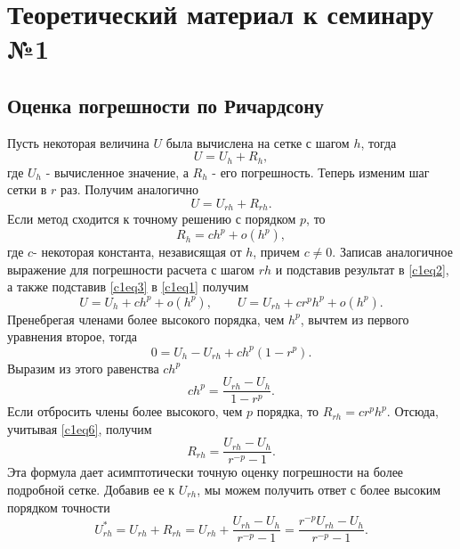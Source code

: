 \section{Теоретический материал к семинару №1}

\subsection{Оценка погрешности по Ричардсону}
Пусть некоторая величина $U$ была вычислена на сетке с шагом $h$, тогда
\begin{equation} \label{c1eq1}
U = U_h + R_h,
\end{equation}
где $U_h$ - вычисленное значение, а $R_h$ - его погрешность. Теперь изменим шаг сетки в $r$ раз. Получим аналогично
\begin{equation} \label{c1eq2}
U = U_{rh} + R_{rh}.
\end{equation}
Если метод сходится к точному решению с порядком $p$, то
\begin{equation} \label{c1eq3}
R_h = ch^p + o(h^p),
\end{equation}
где $c$- некоторая константа, независящая от $h$, причем $c \neq 0$.
Записав аналогичное выражение для погрешности расчета с шагом $rh$ и подставив результат в \eqref{c1eq2}, а также подставив \eqref{c1eq3} в \eqref{c1eq1} получим
\begin{equation} \label{c1eq4}
U = U_h + ch^p + o(h^p),
\qquad 
U = U_{rh} + cr^ph^p + o(h^p).
\end{equation}
Пренебрегая членами более высокого порядка, чем $h^p$, вычтем из первого уравнения второе, тогда
\begin{equation} \label{c1eq5}
0 = U_h - U_{rh} + ch^p(1-r^p).
\end{equation}
Выразим из этого равенства $ch^p$
\begin{equation} \label{c1eq6}
ch^p = \frac{U_{rh} - U_h}{1 - r^p}.
\end{equation}
Если отбросить члены более высокого, чем $p$ порядка, то $R_{rh} = cr^ph^p$. Отсюда, учитывая \eqref{c1eq6}, получим
\begin{equation} \label{c1eq7}
R_{rh} = \frac{U_{rh} - U_h}{r^{-p} - 1}.
\end{equation}
Эта формула дает асимптотически точную оценку погрешности на более подробной сетке. Добавив ее к $U_{rh}$, мы можем получить ответ с более высоким порядком точности
\begin{equation} \label{c1eq8}
U_{rh}^* = U_{rh} + R_{rh} = U_{rh} + \frac{U_{rh} - U_h}{r^{-p} - 1} = \frac{r^{-p}U_{rh} - U_h}{r^{-p} - 1}.
\end{equation}


